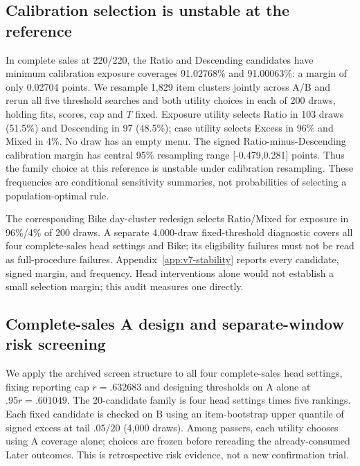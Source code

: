 \subsection{Calibration selection is unstable at the reference}
\label{sec:selection-stability}
In complete sales at 220/220, the Ratio and Descending candidates have minimum calibration exposure coverages 91.02768\% and 91.00063\%: a margin of only 0.02704 points. We resample 1,829 item clusters jointly across A/B and rerun all five threshold searches and both utility choices in each of 200 draws, holding fits, scores, cap and $T$ fixed. Exposure utility selects Ratio in 103 draws (51.5\%) and Descending in 97 (48.5\%); case utility selects Excess in 96\% and Mixed in 4\%. No draw has an empty menu. The signed Ratio-minus-Descending calibration margin has central 95\% resampling range [-0.479,0.281] points. Thus the family choice at this reference is unstable under calibration resampling. These frequencies are conditional sensitivity summaries, not probabilities of selecting a population-optimal rule.

The corresponding Bike day-cluster redesign selects Ratio/Mixed for exposure in 96\%/4\% of 200 draws. A separate 4,000-draw fixed-threshold diagnostic covers all four complete-sales head settings and Bike; its eligibility failures must not be read as full-procedure failures. Appendix~\ref{app:v7-stability} reports every candidate, signed margin, and frequency. Head interventions alone would not establish a small selection margin; this audit measures one directly.

\subsection{Complete-sales A design and separate-window risk screening}
\label{sec:complete-screen}
We apply the archived screen structure to all four complete-sales head settings, fixing reporting cap $r=.632683$ and designing thresholds on A alone at $.95r=.601049$. The 20-candidate family is four head settings times five rankings. Each fixed candidate is checked on B using an item-bootstrap upper quantile of signed excess at tail $.05/20$ (4,000 draws). Among passers, each utility chooses using A coverage alone; choices are frozen before rereading the already-consumed Later outcomes. This is retrospective risk evidence, not a new confirmation trial.


